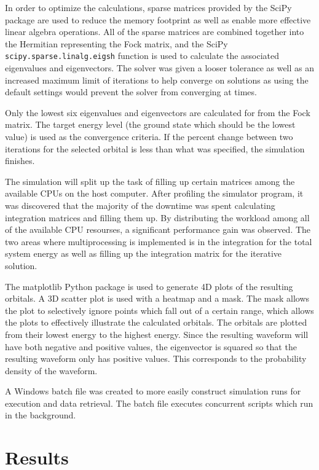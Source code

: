 \documentclass[10pt, oneside, letterpaper]{article}
\begin{document}
In order to optimize the calculations, sparse matrices provided by the SciPy package are used to reduce the memory footprint as well as enable more effective linear algebra operations. All of the sparse matrices are combined together into the Hermitian representing the Fock matrix, and the SciPy \texttt{scipy.sparse.linalg.eigsh} function is used to calculate the associated eigenvalues and eigenvectors. The solver was given a looser tolerance as well as an increased maximum limit of iterations to help converge on solutions as using the default settings would prevent the solver from converging at times.

Only the lowest six eigenvalues and eigenvectors are calculated for from the Fock matrix. The target energy level (the ground state which should be the lowest value) is used as the convergence criteria. If the percent change between two iterations for the selected orbital is less than what was specified, the simulation finishes.

The simulation will split up the task of filling up certain matrices among the available CPUs on the host computer. After profiling the simulator program, it was discovered that the majority of the downtime was spent calculating integration matrices and filling them up. By distributing the workload among all of the available CPU resourses, a significant performance gain was observed. The two areas where multiprocessing is implemented is in the integration for the total system energy as well as filling up the integration matrix for the iterative solution.

The matplotlib Python package is used to generate 4D plots of the resulting orbitals. A 3D scatter plot is used with a heatmap and a mask. The mask allows the plot to selectively ignore points which fall out of a certain range, which allows the plots to effectively illustrate the calculated orbitals. The orbitals are plotted from their lowest energy to the highest energy. Since the resulting waveform will have both negative and positive values, the eigenvector is squared so that the resulting waveform only has positive values. This corresponds to the probability density of the waveform.

A Windows batch file was created to more easily construct simulation runs for execution and data retrieval. The batch file executes concurrent scripts which run in the background.

\newpage
\section{Results}
\end{document}
